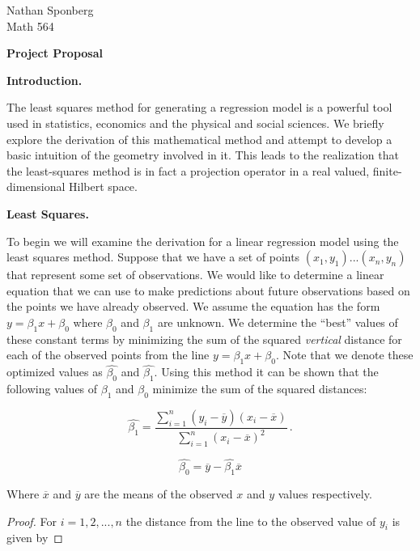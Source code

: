 \documentclass[a4paper]{article}
\newcommand{\br} [1] {\overline{#1}}
\newcommand{\tab} {\hspace{5mm}}
\numberwithin{equation}{section}
\begin{document}
\begin{flushright}
{\small{Nathan Sponberg\\}}
{\small{Math 564}}
\end{flushright}

\begin{center}
\bf{Project Proposal}
\end{center}


\begin{description}

\item \textbf{Introduction.}

\tab The least squares method for generating a regression model is a powerful tool used in statistics, economics and the physical and social sciences. We briefly explore the derivation of this mathematical method and attempt to develop a basic intuition of the geometry involved in it. This leads to the realization that the least-squares method is in fact a projection operator in a real valued, finite-dimensional Hilbert space.

\item \textbf{Least Squares.}

\tab To begin we will examine the derivation for a linear regression model using the least squares method. Suppose that we have a set of points $(x_1,y_1)...(x_n,y_n)$ that represent some set of observations. We would like to determine a linear equation that we can use to make predictions about future observations based on the points we have already observed. We assume the equation has the form $y = \beta_1x+\beta_0$ where $\beta_0$ and $\beta_1$ are unknown. We determine the ``best'' values of these constant terms by minimizing the sum of the squared \textit{vertical} distance for each of the observed points from the line $y = \beta_1x+\beta_0$. Note that we denote these optimized values as $\hat{\beta_0}$ and $\hat{\beta_1}$. Using this method it can be shown that the following values of $\beta_1$ and $\beta_0$ minimize the sum of the squared distances:

$$\hat{\beta_1} = \frac{\sum_{i=1}^n (y_i - \br{y})(x_i - \br{x})}{\sum_{i=1}^n (x_i - \br{x})^2}\,.$$

$$\hat{\beta_0} = \br{y} - \hat{\beta_1}\br{x}$$

Where $\br{x}$ and $\br{y}$ are the means of the observed $x$ and $y$ values respectively.

\begin{proof} For $i = 1,2,...,n$ the distance from the line to the observed value of $y_i$ is given by


\end{proof}
\end{description}
\end{document}
